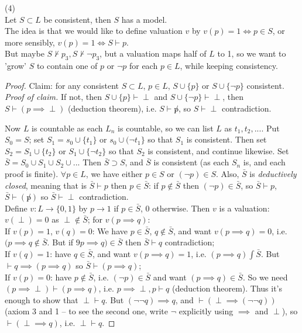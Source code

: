 \documentclass[a4paper]{article}
\begin{document}
\begin{thm} (4)\\
Let $S \subset L$ be consistent, then $S$ has a model.\\
The idea is that we would like to define valuation $v$ by $v(p) = 1 \iff p \in S$, or more sensibly, $v(p)=1 \iff S \vdash p$.\\
But maybe $S \not \vdash p_3, S \not\vdash \neg p_3$, but a valuation maps half of $L$ to 1, so we want to 'grow' $S$ to contain one of $p$ or $\neg p$ for each $p \in L$, while keeping consistency.
\begin{proof}
Claim: for any consistent $S \subset L$, $p \in L$, $S \cup \{p\}$ or $S \cup \{\neg p\}$ consistent.
\emph{Proof of claim.} If not, then $S \cup \{p\} \vdash \perp$ and $S \cup \{\neg p\} \vdash \perp$, then $S \vdash (p \implies \perp)$ (deduction theorem), i.e. $S \vdash \not p$, so $S \vdash \perp$ contradiction.

Now $L$ is countable as each $L_n$ is countable, so we can list $L$ as $t_1,t_2,...$. Put $S_0 = S$; set $S_1 = s_0 \cup \{t_1\}$ or $s_0 \cup (\neg t_1\}$ so that $S_1$ is consistent. Then set $S_2 = S_1 \cup \{t_2\}$ or $S_1 \cup \{\neg t_2\}$ so that $S_2$ is consistent, and continue likewise. Set $\bar{S} = S_0 \cup S_1 \cup S_2 \cup ...$ Then $\bar{S} \supset S$, and $\bar{S}$ is consistent (as each $S_n$ is, and each proof is finite). $\forall p \in L$, we have either $p \in S$ or $(\neg p) \in S$. Also, $\bar{S}$ is \emph{deductively closed}, meaning that is $\bar{S} \vdash p$ then $p \in \bar{S}$: if $p \not\in \bar{S}$ then $(\neg p) \in \bar{S}$, so $\bar{S} \vdash p$, $\bar{S} \vdash (\not p)$ so $\bar{S} \vdash \perp$ contradiction.\\
Define $v:L \to \{0,1\}$ by $p \to 1$ if $p \in \bar{S}$, $0$ otherwise. Then $v$ is a valuation: $v(\perp) = 0$ as $\perp \not\in \bar{S}$; for $v(p \implies q)$:\\
If $v(p) = 1$, $v(q) = 0$: We have $p \in \bar{S}$, $q \not\in \bar{S}$, and want $v(p \implies q) = 0$, i.e. $(p \implies q \not\in \bar{S}$. But if $9p \implies q) \in \bar{S}$ then $\bar{S} \vdash q$ contradiction;\\
If $v(q) = 1$: have $q \in \bar{S}$, and want $v(p \implies q) =1$, i.e. $(p \implies q) \int \bar{S}$. But $\vdash q \implies (p \implies q)$ so $\bar{S} \vdash (p \implies q)$;\\
If $v(p) = 0$: have $p \not\in \bar{S}$, i.e. $(\neg p) \in \bar{S}$ and want $(p \implies q) \in \bar{S}$. So we need $(p \implies \perp) \vdash (p \implies q)$, i.e. $p \implies \perp,p \vdash q$ (deduction theorem). Thus it's enough to show that $\perp \vdash q$. But $(\neg\neg q) \implies q$, and $\vdash (\perp \implies (\neg\neg q))$ (axiom 3 and 1 -- to see the second one, write $\neg$ explicitly using $\implies$ and $\perp$), so $\vdash(\perp \implies q)$, i.e. $\perp\vdash q$.
\end{proof}
\end{thm}
\end{document}
